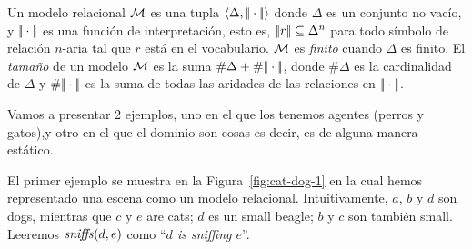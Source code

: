Un modelo relacional $\mathcal{M}$ es una tupla 
$\langle \Delta,|\!|\cdot|\!| \rangle$ donde $\Delta$ es un conjunto no vac\'io, y
$|\!|\cdot|\!|$ es una funci\'on de interpretaci\'on, esto es,
$|\!|r|\!| \subseteq \Delta^n$ para todo s\'imbolo de relaci\'on $n$-aria tal que
$r$ est\'a en el vocabulario. $\mathcal{M}$ es \emph{finito} cuando
$\Delta$ es finito.  El \emph{tama\~no} de un modelo $\mathcal{M}$ es la suma
$\#\Delta + \#|\!|\cdot|\!|$, donde $\#\Delta$ es la cardinalidad
de $\Delta$ y $\#|\!|\cdot|\!|$ es la suma de todas las aridades de las
relaciones en $|\!|\cdot|\!|$.

Vamos a presentar 2 ejemplos, uno en el que los tenemos agentes (perros y gatos),y otro en el que el dominio son cosas es decir, es de alguna manera est\'atico.

El primer ejemplo se muestra en la Figura~\ref{fig:cat-dog-1} en la cual hemos representado una escena
como un modelo relacional. Intuitivamente, $a$, $b$ y $d$ son dogs, mientras que 
$c$ y $e$ are cats;  $d$ es un small beagle;
 $b$ y $c$ son tambi\'en small.
 Leeremos $\mathit{sniffs}(d,e)$ como ``{\em $d$ is sniffing $e$}''.

